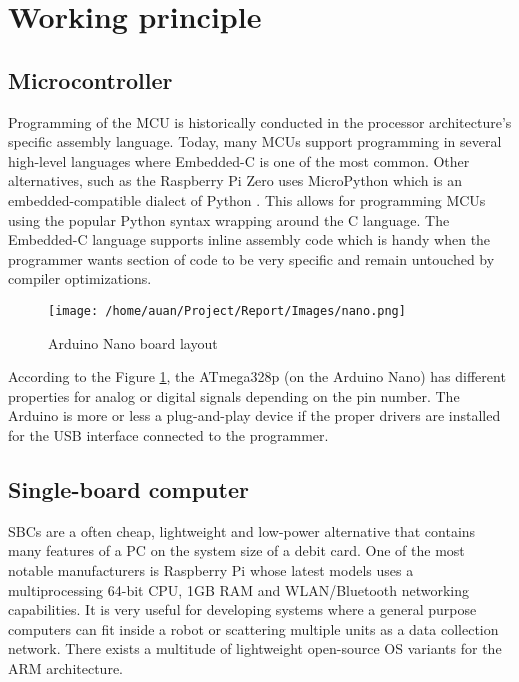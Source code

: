 \section{Working principle}%
\label{sec:working_principle}

\subsection{Microcontroller}%
\label{sub:microcontroller}
Programming of the MCU is historically conducted in the processor architecture's specific assembly language. Today, many MCUs support programming in several high-level languages where Embedded-C is one of the most common. Other alternatives, such as the Raspberry Pi Zero uses MicroPython which is an embedded-compatible dialect of Python \cite{MicroPython}. This allows for programming MCUs using the popular Python syntax wrapping around the C language. The Embedded-C language supports inline assembly code which is handy when the programmer wants section of code to be very specific and remain untouched by compiler optimizations.

\begin{figure}[h]
  \centering
  \texttt{[image: /home/auan/Project/Report/Images/nano.png]}
  \caption{Arduino Nano board layout \cite{PinoutNANO}}
  \label{fig:nano}
\end{figure}

According to the Figure \ref{fig:nano}, the ATmega328p (on the Arduino Nano) has different properties for analog or digital signals depending on the pin number. The Arduino is more or less a plug-and-play device if the proper drivers are installed for the USB interface connected to the programmer.

\subsection{Single-board computer}%
\label{sub:single_board_computer}
SBCs are a often cheap, lightweight and low-power alternative that contains many features of a PC on the system size of a debit card. One of the most notable manufacturers is Raspberry Pi whose latest models uses a multiprocessing 64-bit CPU, 1GB RAM and WLAN/Bluetooth networking capabilities. It is very useful for developing systems where a general purpose computers can fit inside a robot or scattering multiple units as a data collection network. There exists a multitude of lightweight open-source OS variants for the ARM architecture.

